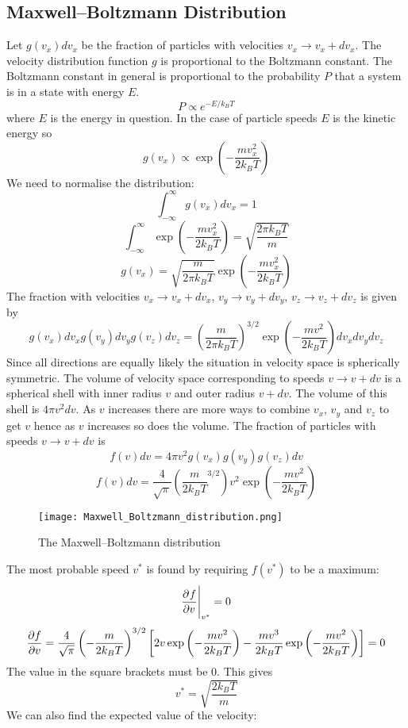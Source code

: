 \documentclass{article}
\begin{document}
    \subsection{Maxwell--Boltzmann Distribution}\label{sec:boltzmann factor}
    Let \(g(v_x)dv_x\) be the fraction of particles with velocities \(v_x\to v_x + dv_x\).
    The velocity distribution function \(g\) is proportional to the Boltzmann constant.
    The Boltzmann constant in general is proportional to the probability \(P\) that a system is in a state with energy \(E\).
    \[P\propto e^{-E/k_BT}\]
    where \(E\) is the energy in question.
    In the case of particle speeds \(E\) is the kinetic energy so
    \[g(v_x) \propto \exp\left(-\frac{mv_x^2}{2k_BT}\right)\]
    We need to normalise the distribution:
    \[\int_{-\infty}^{\infty} g(v_x)dv_x = 1\]
    \[\int_{-\infty}^{\infty} \exp\left(-\frac{mv_x^2}{2k_BT}\right) = \sqrt{\frac{2\pi k_BT}{m}}\]
    \[g(v_x) = \sqrt{\frac{m}{2\pi k_BT}}\exp\left(-\frac{mv_x^2}{2k_BT}\right)\]
    The fraction with velocities \(v_x\to v_x + dv_x\), \(v_y\to v_y + dv_y\), \(v_z\to v_z + dv_z\) is given by
    \[g(v_x)dv_xg(v_y)dv_yg(v_z)dv_z = \left(\frac{m}{2\pi k_BT}\right)^{3/2}\exp\left(-\frac{mv^2}{2k_BT}\right)dv_xdv_ydv_z\]
    Since all directions are equally likely the situation in velocity space is spherically symmetric.
    The volume of velocity space corresponding to speeds \(v\to v + dv\) is a spherical shell with inner radius \(v\) and outer radius \(v + dv\).
    The volume of this shell is \(4\pi v^2dv\).
    As \(v\) increases there are more ways to combine \(v_x\), \(v_y\) and \(v_z\) to get \(v\) hence as \(v\) increases so does the volume.
    The fraction of particles with speeds \(v\to v + dv\) is
    \[f(v)dv = 4\pi v^2g(v_x)g(v_y)g(v_z)dv\]
    \[f(v)dv = \frac{4}{\sqrt{\pi}}\left(\frac{m}{2k_BT}^{3/2}\right)v^2\exp\left(-\frac{mv^2}{2k_BT}\right)\]
    \begin{figure}[ht]
        \centering
        \texttt{[image: Maxwell\_Boltzmann\_distribution.png]}
        \caption{The Maxwell--Boltzmann distribution}
    \end{figure}
    The most probable speed \(v^*\) is found by requiring \(f(v^*)\) to be a maximum:
    \[\pdv[]{f}{v}\Biggr|_{v^*} = 0\]
    \[\pdv{f}{v} = \frac{4}{\sqrt{\pi}} \left(-\frac{m}{2k_BT}\right)^{3/2} \left[2v\exp\left(-\frac{mv^2}{2k_BT}\right) - \frac{mv^3}{2k_BT} \exp\left(-\frac{mv^2}{2k_BT}\right)\right] = 0\]
    The value in the square brackets must be 0.
    This gives
    \[v^* = \sqrt{\frac{2k_BT}{m}}\]
    We can also find the expected value of the velocity:
\end{document}
